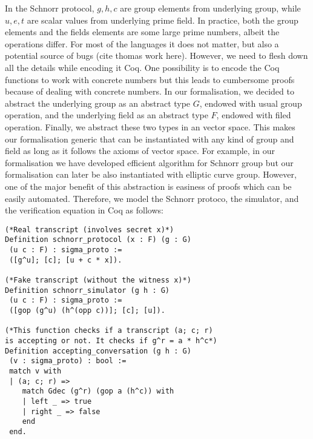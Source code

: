 \documentclass[conference,compsoc]{IEEEtran}
\begin{document}
In the Schnorr protocol, $g, h, c$ are group elements from underlying group, while 
$u, e, t$ are scalar values from underlying prime field. In practice, 
both the group elements and the fields elements are some large prime numbers,
albeit the operations differ. For most of the languages it does not matter, 
but also a potential source of bugs (cite thomas work here). However, 
we need to flesh down all the details while encoding it Coq. One possibility is 
to encode the Coq functions to work with concrete numbers but this leads to 
cumbersome proofs because of dealing with concrete numbers. In our formalisation, 
we decided to abstract the underlying group as an abstract type $G$, endowed with 
usual group operation, and the underlying field as an abstract type $F$, endowed with 
filed operation. Finally, we abstract these two types in an vector space. This 
makes our formalisation generic that can be instantiated with 
any kind of group and field as long as it follows the axioms of 
vector space. For example, in our formalisation we have developed 
efficient algorithm for Schnorr group but our formalisation can 
later be also instantiated with elliptic curve group. However, 
one of the major benefit of this abstraction is easiness of proofs 
which can be easily automated. Therefore, we model the Schnorr 
protoco, the simulator, and the verification equation in Coq as follows: 
 
\begin{lstlisting}[frame=single, language=Coq, caption={Schnorr protocol},
  label={ind_nat},captionpos=t, basicstyle=\ttfamily\footnotesize,
  abovecaptionskip=-\medskipamount]
(*Real transcript (involves secret x)*)
Definition schnorr_protocol (x : F) (g : G) 
 (u c : F) : sigma_proto :=  
 ([g^u]; [c]; [u + c * x]).

(*Fake transcript (without the witness x)*)
Definition schnorr_simulator (g h : G) 
 (u c : F) : sigma_proto := 
 ([gop (g^u) (h^(opp c))]; [c]; [u]).

(*This function checks if a transcript (a; c; r) 
is accepting or not. It checks if g^r = a * h^c*)
Definition accepting_conversation (g h : G) 
 (v : sigma_proto) : bool :=
 match v with
 | (a; c; r) =>  
    match Gdec (g^r) (gop a (h^c)) with 
    | left _ => true
    | right _ => false 
    end
 end.
\end{lstlisting}
  
\end{document}
